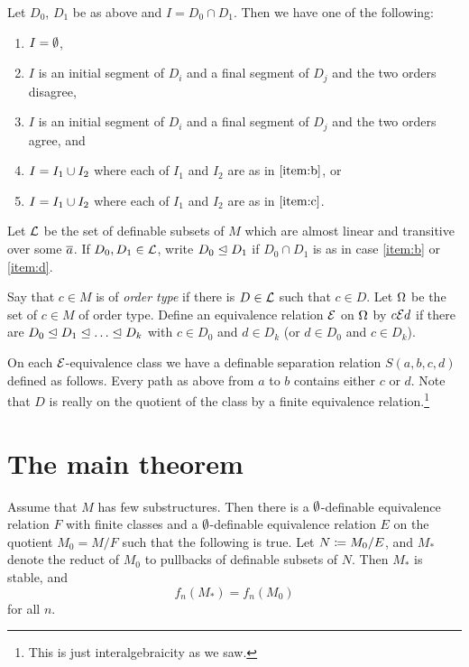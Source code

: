 \documentclass{amsart}
\begin{document}
\begin{cor}
Let $D_{0}$, $D_1$ be as above and $I = D_0\cap D_1$. Then we have one of the following:
\begin{enumerate}[label = (\abc)]
\item $I = \emptyset$,
\label{item:a}
\item $I$ is an initial segment of $D_i$ and a final segment of $D_j$ and the two orders
disagree,
\label{item:b}
\item $I$ is an initial segment of $D_i$ and a final segment of $D_j$ and the two orders
agree, and
\label{item:c}
\item $I = I_1\cup I_2$ where each of $I_1$ and $I_2$ are as in $\ref{item:b}$, or
\label{item:d}
\item $I = I_1\cup I_2$ where each of $I_1$ and $I_2$ are as in $\ref{item:c}$.
\label{item:e}
\end{enumerate}
\end{cor}

Let $\mathcal{L}$ be the set of definable subsets of $M$ which are almost linear and transitive
over some $\overline{a}$. If $D_0,D_1\in \mathcal{L}$, write $D_0\trianglelefteq D_1$ if 
$D_0\cap D_1$ is as in case \ref{item:b} or \ref{item:d}.

Say that $c\in M$ is of \emph{order type} if there is $D\in \mathcal{L}$ such that $c\in D$.
Let $\Omega$ be the set of $c\in M$ of order type. Define an equivalence relation $\mathcal{E}$ on
$\Omega$ by $c\mathcal{E} d$ if there are $D_0\trianglelefteq D_1 \trianglelefteq \ldots \trianglelefteq D_k$ with $c\in D_0$
and $d\in D_k$ (or $d\in D_0$ and $c\in D_k$).

On each $\mathcal{E}$-equivalence class we have a definable separation relation
$S\left(a,b,c,d\right)$ defined as follows. Every path as above from $a$ to $b$ contains
either $c$ or $d$.
Note that $D$ is really on the quotient of the class by a finite equivalence
relation.\footnote{This is just interalgebraicity as we saw.}

\section{The main theorem}

\begin{thm}
Assume that $M$ has few substructures. Then there is a $\emptyset$-definable equivalence
relation $F$ with finite classes and a $\emptyset$-definable equivalence relation $E$ on the
quotient $M_0= M / F$ such that the following is true.
Let $N\coloneqq M_0 / E$, and $M_*$ denote the reduct of $M_0$ to pullbacks of definable
subsets of $N$.
Then $M_*$ is stable, and
\begin{equation}
f_n\left(M_*\right) = f_n\left(M_0\right)
\end{equation}
for all $n$.
\end{thm}
\end{document}
